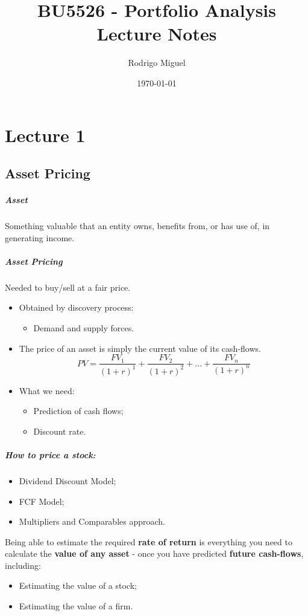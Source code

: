 \documentclass[11pt,a4paper]{report}
\title{BU5526 - Portfolio Analysis \\ Lecture Notes}
\author{Rodrigo Miguel}
\date{\today}
\begin{document}
\maketitle
\tableofcontents

\chapter{Lecture 1}
\section{Asset Pricing}
\paragraph{Asset}
Something valuable that an entity owns, benefits from, or has use of, in generating income.
\paragraph{Asset Pricing}
Needed to buy/sell at a fair price.
\begin{itemize}
    \item Obtained by discovery process:
        \begin{itemize}
            \item Demand and supply forces.
        \end{itemize}
    \item The price of an asset is simply the current value of its cash-flows.
    \[ PV = \frac{FV_1}{(1+r)^1} + \frac{FV_2}{(1+r)^2}+ ... + \frac{FV_n}{(1+r)^n} \]
        \item What we need:
        \begin{itemize}
            \item Prediction of cash flows;
            \item Discount rate.
        \end{itemize}
\end{itemize}

\paragraph{How to price a stock:}
\begin{itemize}
    \item Dividend Discount Model;
    \item FCF Model;
    \item Multipliers and Comparables approach.
\end{itemize}
Being able to estimate the required \textbf{rate of return} is everything you need to calculate the \textbf{value of any asset} - once you have predicted \textbf{future cash-flows}, including:
\begin{itemize}
    \item Estimating the value of a stock;
    \item Estimating the value of a firm.
\end{itemize}
\end{document}

